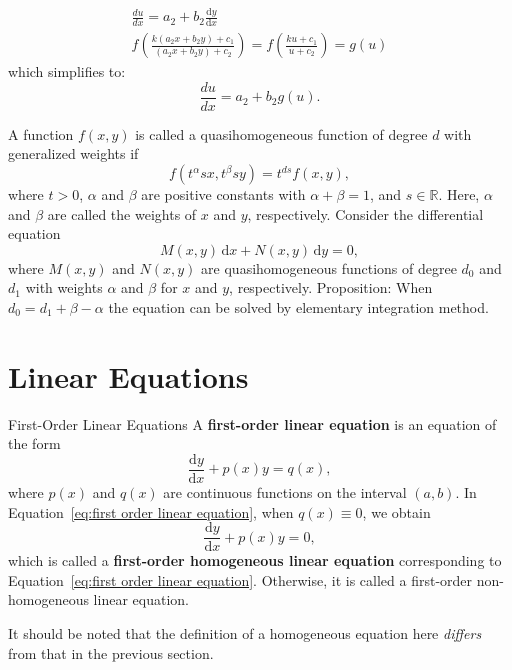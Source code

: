 \documentclass[11pt]{elegantbook}
\begin{document}
\begin{itemize}
\begin{enumerate}
\begin{enumerate}
\begin{gather*}
                            \frac{du}{dx} = a_2 + b_2 \frac{\mathrm{d}y}{\mathrm{d}x} \\
                            f\left( \frac{k(a_2x + b_2y) + c_1}{(a_2x + b_2y) + c_2} \right) 
                                = f\left( \frac{ku + c_1}{u + c_2} \right) = g(u)
                        \end{gather*}
                        which simplifies to:
                        \[
                        \frac{du}{dx} = a_2 + b_2 g(u).
                        \]
                \end{enumerate}
        \end{enumerate}
\end{itemize}






\begin{example}
    A function \(f(x, y)\) is called a quasihomogeneous function of degree \(d\) with generalized weights if
    \[
    f(t^\alpha s x, t^\beta s y) = t^{ds} f(x, y),
    \]
    where \(t > 0\), \(\alpha\) and \(\beta\) are positive constants with \(\alpha + \beta = 1\), and \(s \in \mathbb{R}\). 
    Here, \(\alpha\) and \(\beta\) are called the weights of \(x\) and \(y\), respectively.
    Consider the differential equation
    \[
    M(x, y) \, \mathrm{d}x + N(x, y) \, \mathrm{d}y = 0,
    \]
    where \(M(x, y)\) and \(N(x, y)\) are quasihomogeneous functions of degree \(d_0\) and \(d_1\) 
    with weights \(\alpha\) and \(\beta\) for \(x\) and \(y\), respectively.
    Proposition: When \(d_0 = d_1 + \beta - \alpha\) the equation can be solved by elementary integration method.
\end{example}
\section{Linear Equations}
\begin{definition}{First-Order Linear Equations}
    A \textbf{first-order linear equation} is an equation of the form
    \begin{equation}\label{eq:first order linear equation}
        \frac{\mathrm{d}y}{\mathrm{d}x} + p(x) y = q(x),
    \end{equation}
    where \(p(x)\) and \(q(x)\) are continuous functions on the interval \((a, b)\).
    In Equation~\eqref{eq:first order linear equation}, when \(q(x) \equiv  0\), we obtain
    \begin{equation*}
        \frac{\mathrm{d}y}{\mathrm{d}x} + p(x) y = 0,
    \end{equation*}
    which is called a \textbf{first-order homogeneous linear equation} corresponding to Equation~\eqref{eq:first order linear equation}.
    Otherwise, it is called a first-order non-homogeneous linear equation.
\end{definition}
\begin{note}
    It should be noted that the definition of a homogeneous equation here \emph{differs} from that in the previous section.
\end{note}
\end{document}
